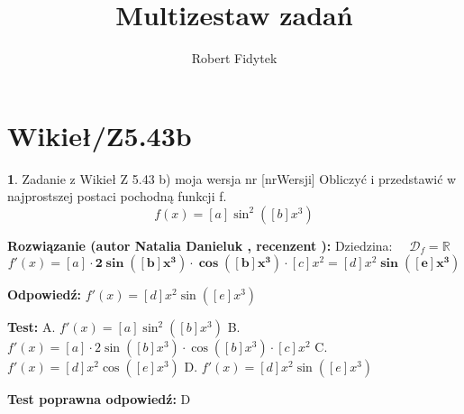 \documentclass[12pt, a4paper]{article}
\title{Multizestaw zadań}
\author{Robert Fidytek}
\date{}
\theoremstyle{definition} %
\newtheorem{zad}{}
\newcommand{\kategoria}[1]{\section{#1}} %
\newcommand{\zadStart}[1]{\begin{zad}#1\newline} %
\newcommand{\zadStop}{\end{zad}}   %
\newcommand{\rozwStart}[2]{\noindent \textbf{Rozwiązanie (autor #1 , recenzent #2): }\newline} %
\newcommand{\rozwStop}{\newline}                                            %
\newcommand{\odpStart}{\noindent \textbf{Odpowiedź:}\newline}    %
\newcommand{\odpStop}{\newline}                                             %
\newcommand{\testStart}{\noindent \textbf{Test:}\newline} %
\newcommand{\testStop}{\newline} %
\newcommand{\kluczStart}{\noindent \textbf{Test poprawna odpowiedź:}\newline} %
\newcommand{\kluczStop}{\newline} %
\begin{document}
\maketitle

\kategoria{Wikieł/Z5.43b}

\zadStart{Zadanie z Wikieł Z 5.43 b) moja wersja nr [nrWersji]}
Obliczyć i przedstawić w najprostszej postaci pochodną funkcji f.
$$f(x) = [a]\sin^2([b]x^3)$$
\zadStop

\rozwStart{Natalia Danieluk}{}
Dziedzina: $\quad \mathcal{D}_f=\mathbb{R}$
$$f'(x) = [a] \cdot \boldsymbol{2 \sin ([b]x^3) \cdot \cos([b]x^3)} \cdot [c]x^2 = [d]x^2 \boldsymbol{\sin ([e]x^3)}$$
\rozwStop

\odpStart
$f'(x) = [d]x^2 \sin ([e]x^3)$
\odpStop

\testStart
A. $f'(x) = [a]\sin^2([b]x^3)$
B. $f'(x) = [a] \cdot 2 \sin ([b]x^3) \cdot \cos([b]x^3) \cdot [c]x^2$
C. $f'(x) = [d]x^2 \cos ([e]x^3)$
D. $f'(x) = [d]x^2 \sin ([e]x^3)$
\testStop

\kluczStart
D
\kluczStop
\end{document}
